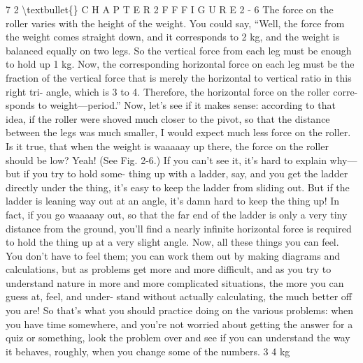 \documentclass[10pt,oneside]{article}
\begin{document}
7 2 \textbackslash{}textbullet\{\} C H A P T E R  2 F F F I G U R E  2 - 6 The force on the roller varies with the height of the weight. You could say, “Well, the force from the weight comes straight down, and it corresponds to 2 kg, and the weight is balanced equally on two legs. So the vertical force from each leg must be enough to hold up 1 kg. Now, the corresponding horizontal force on each leg must be the fraction of the vertical force that is merely the horizontal to vertical ratio in this right tri- angle, which is 3 to 4. Therefore, the horizontal force on the roller corre- sponds to weight---period.” Now, let’s see if it makes sense: according to that idea, if the roller were shoved much closer to the pivot, so that the distance between the legs was much smaller, I would expect much less force on the roller. Is it true, that when the weight is waaaaay up there, the force on the roller should be low? Yeah! (See Fig. 2-6.) If you can’t see it, it’s hard to explain why---but if you try to hold some- thing up with a ladder, say, and you get the ladder directly under the thing, it’s easy to keep the ladder from sliding out. But if the ladder is leaning way out at an angle, it’s damn hard to keep the thing up! In fact, if you go waaaaay out, so that the far end of the ladder is only a very tiny distance from the ground, you’ll find a nearly infinite horizontal force is required to hold the thing up at a very slight angle. Now, all these things you can feel. You don’t have to feel them; you can work them out by making diagrams and calculations, but as problems get more and more difficult, and as you try to understand nature in more and more complicated situations, the more you can guess at, feel, and under- stand without actually calculating, the much better off you are! So that’s what you should practice doing on the various problems: when you have time somewhere, and you’re not worried about getting the answer for a quiz or something, look the problem over and see if you can understand the way it behaves, roughly, when you change some of the numbers. 3 4 kg\par
\end{document}
